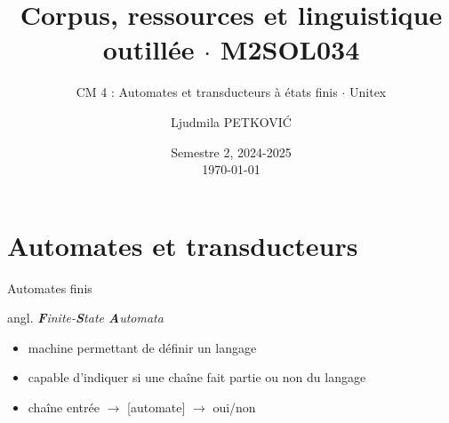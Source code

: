 \documentclass[xetex,xcolor={table,usenames,dvipsnames}]{beamer}
\begin{document}
\title{{\large Corpus, ressources et linguistique outillée $\cdot$ \textsc{M2SOL034}}}
\subtitle{CM 4 : Automates et transducteurs à états finis $\cdot$ Unitex}
\author{\footnotesize{Ljudmila PETKOVI\'C}}
\date{\scriptsize{Semestre 2, 2024-2025\\\today}}




	\frame{\titlepage}

\section{Automates et transducteurs}


\begin{frame}{Automates finis}
	
	{	\scriptsize angl. \textit{\textbf{F}inite-\textbf{S}tate \textbf{A}utomata} }
	
	\begin{itemize}
		\item machine permettant de définir un langage
		\item capable d'indiquer si une chaîne fait partie ou non du langage
		\item chaîne entrée $\rightarrow$ [automate] $\rightarrow$ oui/non
	\end{itemize}


\end{frame}
\end{document}
